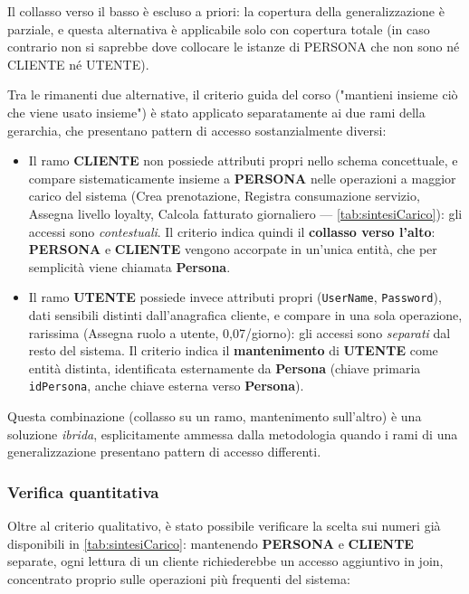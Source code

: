 \documentclass[a4paper,12pt]{report}
\begin{document}
Il collasso verso il basso è escluso a priori: la copertura della
generalizzazione è parziale, e questa alternativa è applicabile solo con
copertura totale (in caso contrario non si saprebbe dove collocare le
istanze di PERSONA che non sono né CLIENTE né UTENTE).

Tra le rimanenti due alternative, il criterio guida del corso ("mantieni
insieme ciò che viene usato insieme") è stato applicato separatamente ai
due rami della gerarchia, che presentano pattern di accesso
sostanzialmente diversi:

\begin{itemize}
    \item Il ramo \textbf{CLIENTE} non possiede attributi propri nello
          schema concettuale, e compare sistematicamente insieme a
          \textbf{PERSONA} nelle operazioni a maggior carico del sistema
          (Crea prenotazione, Registra consumazione servizio, Assegna
          livello loyalty, Calcola fatturato giornaliero ---
          \cref{tab:sintesiCarico}): gli accessi sono \emph{contestuali}.
          Il criterio indica quindi il \textbf{collasso verso l'alto}:
          \textbf{PERSONA} e \textbf{CLIENTE} vengono accorpate in
          un'unica entità, che per semplicità viene chiamata
          \textbf{Persona}.
    \item Il ramo \textbf{UTENTE} possiede invece attributi propri
          (\texttt{UserName}, \texttt{Password}), dati sensibili distinti
          dall'anagrafica cliente, e compare in una sola operazione,
          rarissima (Assegna ruolo a utente, 0,07/giorno): gli accessi
          sono \emph{separati} dal resto del sistema. Il criterio indica
          il \textbf{mantenimento} di \textbf{UTENTE} come entità
          distinta, identificata esternamente da \textbf{Persona}
          (chiave primaria \texttt{idPersona}, anche chiave esterna verso
          \textbf{Persona}).
\end{itemize}

Questa combinazione (collasso su un ramo, mantenimento sull'altro) è una
soluzione \emph{ibrida}, esplicitamente ammessa dalla metodologia quando
i rami di una generalizzazione presentano pattern di accesso differenti.

\subsubsection*{Verifica quantitativa}

Oltre al criterio qualitativo, è stato possibile verificare la scelta sui
numeri già disponibili in \cref{tab:sintesiCarico}: mantenendo
\textbf{PERSONA} e \textbf{CLIENTE} separate, ogni lettura di un cliente
richiederebbe un accesso aggiuntivo in join, concentrato proprio sulle
operazioni più frequenti del sistema:
\end{document}
